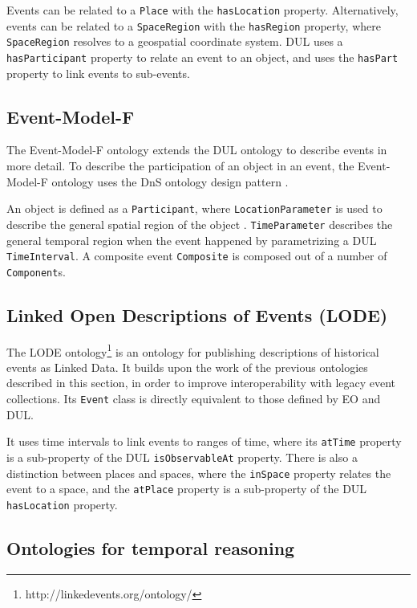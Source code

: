Events can be related to a \texttt{Place} with the \texttt{hasLocation} property. Alternatively, events can be related to a \texttt{SpaceRegion} with the \texttt{hasRegion} property, where \texttt{Space\-Region} resolves to a geospatial coordinate system. \ac{DUL} uses a \texttt{hasParticipant} property to relate an event to an object, and uses the \texttt{hasPart} property to link events to sub-events.

\subsection{Event-Model-F}

The Event-Model-F ontology extends the \ac{DUL} ontology to describe events in more detail. To describe the participation of an object in an event, the Event-Model-F ontology uses the \ac{DnS} ontology design pattern \cite{Shaw2009}. 

An object is defined as a \texttt{Participant}, where \texttt{Lo\-ca\-tion\-Pa\-ra\-meter} is used to describe the general spatial region of the object \cite{Scherp2011}. \texttt{Time\-Parameter} describes the general temporal region when the event happened by parametrizing a \ac{DUL} \texttt{TimeInterval}. A composite event \texttt{Composite} is composed out of a number of \texttt{Com\-po\-nent}s.

\subsection{Linked Open Descriptions of Events (LODE)}

The \ac{LODE} ontology\footnote{http://linkedevents.org/ontology/} is an ontology for publishing descriptions of historical events as Linked Data. It builds upon the work of the previous ontologies described in this section, in order to improve interoperability with legacy event collections. Its \texttt{Event} class is directly equivalent to those defined by \ac{EO} and \ac{DUL}. 

It uses time intervals to link events to ranges of time, where its \texttt{atTime} property is a sub-property of the \ac{DUL} \texttt{isObservableAt} property. There is also a distinction between places and spaces, where the \texttt{inSpace} property relates the event to a space, and the \texttt{atPlace} property is a sub-property of the \ac{DUL} \texttt{hasLocation} property.


\subsection{Ontologies for temporal reasoning}
\label{TemporalReasoning}

